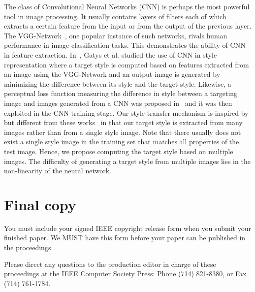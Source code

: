 \documentclass[10pt,twocolumn,letterpaper]{article}
\begin{document}
The class of Convolutional Neural Networks (CNN) is perhaps the most powerful tool in image processing. It usually contains layers of filters each of which extracts a certain feature from the input or from the output of the previous layer. The VGG-Network~\cite{simonyan2014very}, one popular instance of such networks, rivals human performance in image classification tasks. This demonstrates the ability of CNN in feature extraction. In~\cite{gatys2015texture,gatys2015neural}, Gatys et al. studied the use of CNN in style representation where a target style is computed based on features extracted from an image using the VGG-Network and an output image is generated by minimizing the difference between its style and the target style. Likewise, a perceptual loss function measuring the difference in style between a targeting image and images generated from a CNN was proposed in~\cite{feifei2016} and it was then exploited in the CNN training stage. Our style transfer mechanism is inspired by but different from these works~\cite{gatys2015texture,gatys2015neural,feifei2016} in that our target style is extracted from many images rather than from a single style image. Note that there usually does not exist a single style image in the training set that matches all properties of the test image. Hence, we propose computing the target style based on multiple images. The difficulty of generating a target style from multiple images lies in the non-linearity of the neural network.

\section{Final copy}

You must include your signed IEEE copyright release form when you submit
your finished paper. We MUST have this form before your paper can be
published in the proceedings.

Please direct any questions to the production editor in charge of these
proceedings at the IEEE Computer Society Press: Phone (714) 821-8380, or
Fax (714) 761-1784.

{\small


}
\end{document}
